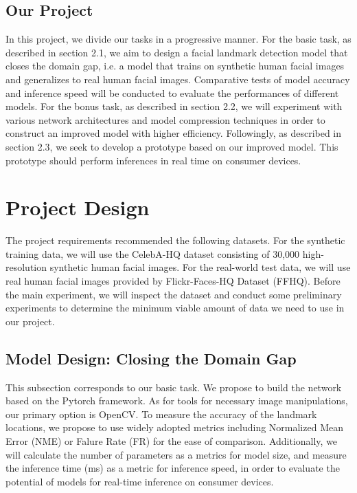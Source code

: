 \documentclass[12pt]{article}
\begin{document}
\subsection{Our Project}
In this project, we divide our tasks in a progressive manner. For the basic task, as described in section 2.1, we aim to design a facial landmark detection model that closes the domain gap, i.e. a model that trains on synthetic human facial images and generalizes to real human facial images. Comparative tests of model accuracy and inference speed will be conducted to evaluate the performances of different models. For the bonus task, as described in section 2.2, we will experiment with various network architectures and model compression techniques in order to construct an improved model with higher efficiency. Followingly, as described in section 2.3, we seek to develop a prototype based on our improved model. This prototype should perform inferences in real time on consumer devices.


\section{Project Design}

The project requirements recommended the following datasets. For the synthetic training data, we will use the CelebA-HQ dataset consisting of 30,000 high-resolution synthetic human facial images\cite{Huang.7172018}. For the real-world test data, we will use real human facial images provided by Flickr-Faces-HQ Dataset (FFHQ)\cite{Karras.12122018}. Before the main experiment, we will inspect the dataset and conduct some preliminary experiments to determine the minimum viable amount of data we need to use in our project.

\subsection{Model Design: Closing the Domain Gap}

This subsection corresponds to our basic task. We propose to build the network based on the Pytorch framework. As for tools for necessary image manipulations, our primary option is OpenCV. To measure the accuracy of the landmark locations, we propose to use widely adopted metrics including Normalized Mean Error (NME) or Falure Rate (FR) for the ease of comparison. Additionally, we will calculate the number of parameters as a metrics for model size, and measure the inference time (ms) as a metric for inference speed, in order to evaluate the potential of models for real-time inference on consumer devices.
\end{document}
